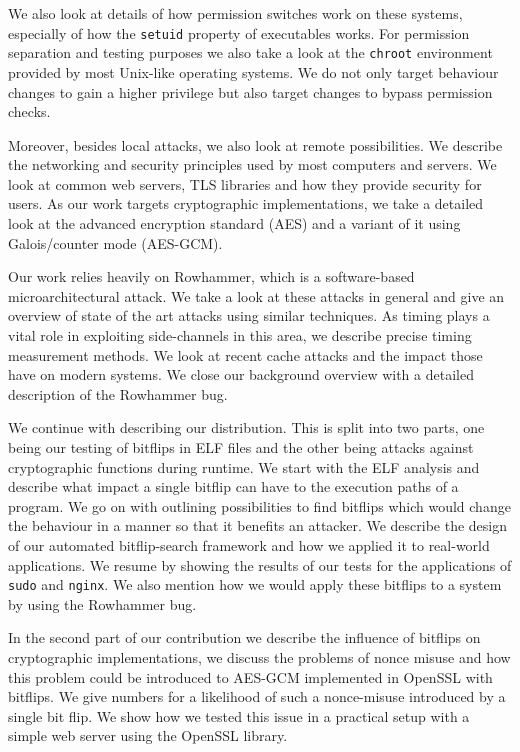 We also look at details of how permission switches work on these systems,
especially of how the \texttt{setuid} property of executables works. For
permission separation and testing purposes we also take a look at the
\texttt{chroot} environment provided by most Unix-like operating systems. We
do not only target behaviour changes to gain a higher privilege but also target
changes to bypass permission checks.

Moreover, besides local attacks, we also look at remote possibilities. We
describe the networking and security principles used by most computers and
servers. We look at common web servers, TLS libraries and how they provide
security for users. As our work targets cryptographic implementations, we take
a detailed look at the advanced encryption standard (AES) and a variant of it
using Galois/counter mode (AES-GCM).

Our work relies heavily on Rowhammer, which is a software-based
microarchitectural attack. We take a look at these attacks in general and give
an overview of state of the art attacks using similar techniques. As timing
plays a vital role in exploiting side-channels in this area, we describe precise
timing measurement methods. We look at recent cache attacks and the impact
those have on modern systems. We close our background overview with a detailed
description of the Rowhammer bug.

We continue with describing our distribution. This is split into two parts, one
being our testing of bitflips in ELF files and the other being attacks against
cryptographic functions during runtime. We start with the ELF analysis and
describe what impact a single bitflip can have to the execution paths of a
program. We go on with outlining possibilities to find bitflips which would
change the behaviour in a manner so that it benefits an attacker. We describe
the design of our automated bitflip-search framework and how we applied it to
real-world applications. We resume by showing the results of our tests for
the applications of \texttt{sudo} and \texttt{nginx}. We also mention how we
would apply these bitflips to a system by using the Rowhammer bug.

In the second part of our contribution we describe the influence of bitflips on
cryptographic implementations, we discuss the problems of nonce misuse and how
this problem could be introduced to AES-GCM implemented in OpenSSL with
bitflips. We give numbers for a likelihood of such a nonce-misuse introduced by
a single bit flip. We show how we tested this issue in a practical setup with a
simple web server using the OpenSSL library.

